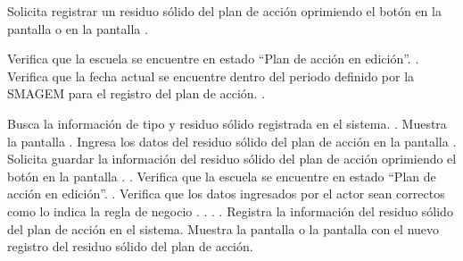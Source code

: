  \begin{UCtrayectoria}
    \UCpaso[\UCactor] Solicita registrar un residuo sólido del plan de acción oprimiendo el botón  en la pantalla  o en la pantalla .

	\UCpaso[\UCsist] Verifica que la escuela se encuentre en  estado ``Plan de acción en edición''. .
    \UCpaso[\UCsist] Verifica que la fecha actual se encuentre dentro del periodo definido por la SMAGEM para el registro del plan de acción. .
        
    \UCpaso[\UCsist] Busca la información de tipo y residuo sólido registrada en el sistema. .
    \UCpaso[\UCsist] Muestra la pantalla .
    \UCpaso[\UCactor] Ingresa los datos del residuo sólido del plan de acción en la pantalla . \label{cupr1:ingresarInfo}
    \UCpaso[\UCactor] Solicita guardar la información del residuo sólido del plan de acción oprimiendo el botón  en la pantalla . .
    	\UCpaso[\UCsist] Verifica que la escuela se encuentre en  estado ``Plan de acción en edición''. .
    \UCpaso[\UCsist] Verifica que los datos ingresados por el actor sean correctos como lo indica la regla de negocio . . . .
    \UCpaso[\UCsist] Registra la información del residuo sólido del plan de acción en el sistema.
    \UCpaso[\UCsist] Muestra la pantalla  o la pantalla  con el nuevo registro del residuo sólido del plan de acción. 
    
 \end{UCtrayectoria}
 

